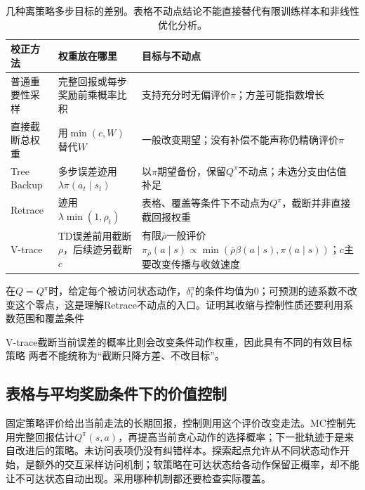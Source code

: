 \begin{table}[t]
  \centering
  \small
  \begin{tabularx}{\linewidth}{>{\raggedright\arraybackslash}p{23mm} >{\raggedright\arraybackslash}X >{\raggedright\arraybackslash}X}
    \toprule
    校正方法 & 权重放在哪里 & 目标与不动点 \\
    \midrule
    普通重要性采样 & 完整回报或每步奖励前乘概率比积 & 支持充分时无偏评价$\pi$；方差可能指数增长 \\
    直接截断总权重 & 用$\min(c,W)$替代$W$ & 一般改变期望；没有补偿不能声称仍精确评价$\pi$ \\
    Tree Backup & 多步误差迹用$\lambda\pi(a_t\mid s_t)$ & 以$\pi$期望备份，保留$Q^\pi$不动点；未选分支由估值补足 \\
    Retrace & 迹用$\lambda\min(1,\rho_t)$ & 表格、覆盖等条件下不动点为$Q^\pi$，截断并非直接截回报权重 \\
    V-trace & TD误差前用截断$\rho$，后续迹另截断$c$ & 有限$\bar\rho$一般评价$\pi_{\bar\rho}(a\mid s)\propto\min(\bar\rho\beta(a\mid s),\pi(a\mid s))$；$c$主要改变传播与收敛速度 \\
    \bottomrule
  \end{tabularx}
  \caption{几种离策略多步目标的差别。表格不动点结论不能直接替代有限训练样本和非线性优化分析。}
  \label{tab:rl-learning-off-policy-targets}
\end{table}

在$Q=Q^\pi$时，给定每个被访问状态动作，$\delta_t^\pi$的条件均值为0；可预测的迹系数不改变这个零点，这是理解Retrace不动点的入口。证明其收缩与控制性质还要利用系数范围和覆盖条件

V-trace截断当前误差的概率比则会改变条件动作权重，因此具有不同的有效目标策略
两者不能统称为“截断只降方差、不改目标”。

\subsection{表格与平均奖励条件下的价值控制}
\label{sec:rl-learning-tabular-control}

固定策略评价给出当前走法的长期回报，控制则用这个评价改变走法。MC控制先用完整回报估计$Q^\pi(s,a)$，再提高当前贪心动作的选择概率；下一批轨迹于是来自改进后的策略。未访问表项仍没有纠错样本。探索起点允许从不同状态动作开始，是额外的交互采样访问机制；软策略在可达状态给各动作保留正概率，却不能让不可达状态自动出现。采用哪种机制都还要检查实际覆盖。

